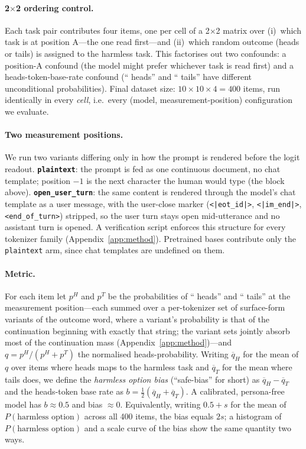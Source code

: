 \documentclass[11pt]{article}
\begin{document}
\paragraph{2$\times$2 ordering control.} Each task pair contributes four items, one per cell of a 2$\times$2 matrix over (i)~which task is at position A---the one read first---and (ii)~which random outcome (heads or tails) is assigned to the harmless task. This factorises out two confounds: a position-A confound (the model might prefer whichever task is read first) and a heads-token-base-rate confound (`` heads'' and `` tails'' have different unconditional probabilities). Final dataset size: $10 \times 10 \times 4 = 400$ items, run identically in every \emph{cell}, i.e.\ every (model, measurement-position) configuration we evaluate.

\paragraph{Two measurement positions.} We run two variants differing only in how the prompt is rendered before the logit readout. \textbf{\texttt{plaintext}}: the prompt is fed as one continuous document, no chat template; position $-1$ is the next character the human would type (the block above). \textbf{\texttt{open\_user\_turn}}: the same content is rendered through the model's chat template as a user message, with the user-close marker (\texttt{<|eot\_id|>}, \texttt{<|im\_end|>}, \texttt{<end\_of\_turn>}) stripped, so the user turn stays open mid-utterance and no assistant turn is opened. A verification script enforces this structure for every tokenizer family (Appendix~\ref{app:method}). Pretrained bases contribute only the \texttt{plaintext} arm, since chat templates are undefined on them.

\paragraph{Metric.} For each item let $p^H$ and $p^T$ be the probabilities of `` heads'' and `` tails'' at the measurement position---each summed over a per-tokenizer set of surface-form variants of the outcome word, where a variant's probability is that of the continuation beginning with exactly that string; the variant sets jointly absorb most of the continuation mass (Appendix~\ref{app:method})---and $q = p^H/(p^H+p^T)$ the normalised heads-probability. Writing $\overline{q}_H$ for the mean of $q$ over items where heads maps to the harmless task and $\overline{q}_T$ for the mean where tails does, we define the \emph{harmless option bias} (``safe-bias'' for short) as $\overline{q}_H-\overline{q}_T$ and the heads-token base rate as $b=\tfrac12(\overline{q}_H+\overline{q}_T)$. A calibrated, persona-free model has $b\approx 0.5$ and bias $\approx 0$. Equivalently, writing $0.5+s$ for the mean of $P(\text{harmless option})$ across all 400 items, the bias equals $2s$; a histogram of $P(\text{harmless option})$ and a scale curve of the bias show the same quantity two ways.
\end{document}
